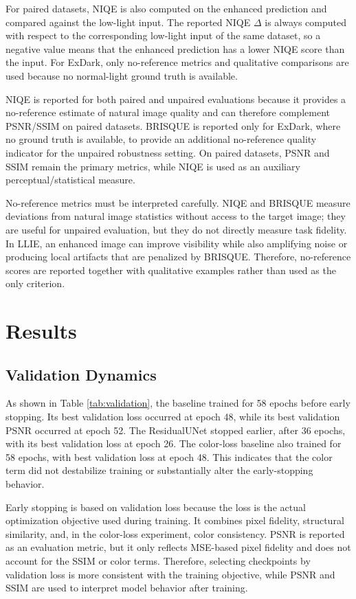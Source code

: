 \documentclass[10pt,twocolumn]{article}
\begin{document}
For paired datasets, NIQE is also computed on the enhanced prediction and compared against the low-light input. The reported NIQE $\Delta$ is always computed with respect to the corresponding low-light input of the same dataset, so a negative value means that the enhanced prediction has a lower NIQE score than the input. For ExDark, only no-reference metrics and qualitative comparisons are used because no normal-light ground truth is available.

NIQE is reported for both paired and unpaired evaluations because it provides a no-reference estimate of natural image quality and can therefore complement PSNR/SSIM on paired datasets. BRISQUE is reported only for ExDark, where no ground truth is available, to provide an additional no-reference quality indicator for the unpaired robustness setting. On paired datasets, PSNR and SSIM remain the primary metrics, while NIQE is used as an auxiliary perceptual/statistical measure.

No-reference metrics must be interpreted carefully. NIQE and BRISQUE measure deviations from natural image statistics without access to the target image; they are useful for unpaired evaluation, but they do not directly measure task fidelity. In LLIE, an enhanced image can improve visibility while also amplifying noise or producing local artifacts that are penalized by BRISQUE. Therefore, no-reference scores are reported together with qualitative examples rather than used as the only criterion.

\section{Results}
\subsection{Validation Dynamics}
As shown in Table \ref{tab:validation}, the baseline trained for 58 epochs before early stopping. Its best validation loss occurred at epoch 48, while its best validation PSNR occurred at epoch 52. The ResidualUNet stopped earlier, after 36 epochs, with its best validation loss at epoch 26. The color-loss baseline also trained for 58 epochs, with best validation loss at epoch 48. This indicates that the color term did not destabilize training or substantially alter the early-stopping behavior.

Early stopping is based on validation loss because the loss is the actual optimization objective used during training. It combines pixel fidelity, structural similarity, and, in the color-loss experiment, color consistency. PSNR is reported as an evaluation metric, but it only reflects MSE-based pixel fidelity and does not account for the SSIM or color terms. Therefore, selecting checkpoints by validation loss is more consistent with the training objective, while PSNR and SSIM are used to interpret model behavior after training.
\end{document}
